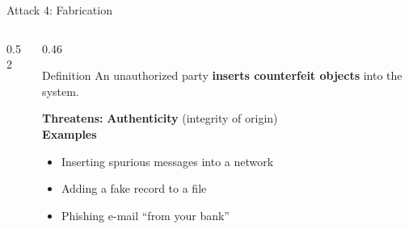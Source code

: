 \documentclass[aspectratio=169,11pt,xcolor={table}]{beamer}
\begin{document}
\begin{frame}{Attack 4: Fabrication}
  \begin{columns}[c]
    \begin{column}{0.52\textwidth}
      \centering
    \end{column}
    \begin{column}{0.46\textwidth}
      \begin{alertblock}{Definition}
        An unauthorized party \textbf{inserts counterfeit objects} into the system.
      \end{alertblock}
      \vspace{1mm}
      \textbf{Threatens:} \textcolor{aqua!70!black}{\textbf{Authenticity}} (integrity of origin)\\[3pt]
      \textbf{Examples}
      \begin{itemize}\small
        \item Inserting spurious messages into a network
        \item Adding a fake record to a file
        \item Phishing e-mail ``from your bank''
      \end{itemize}
    \end{column}
  \end{columns}
\end{frame}
\end{document}
